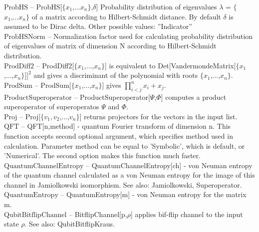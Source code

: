 \documentclass[a4paper,10pt]{scrartcl}
\begin{document}
\textbf{$ \text{ProbHS} $ }-- ProbHS[$\{$$ x_1\text{,...}x_n $$\}$,$\delta $] Probability distribution of eigenvalues $\lambda $ = $\{$$ x_1\text{,...}x_n $$\}$ of a matrix according to Hilbert-Schmidt distance. By default $\delta $ is assumed to be Dirac delta. Other possible values: ''Indicator''$  $\\

\textbf{$ \text{ProbHSNorm} $ }-- Normalization factor used for calculating probability distribution of eigenvalues of matrix of dimension N according to Hilbert-Schmidt distribution.$  $\\

\textbf{$ \text{ProdDiff2} $ }-- ProdDiff2[$\{$$ x_1 $,...,$ x_n $$\}$] is equivalent to Det[VandermondeMatrix[$\{$$ x_1 $,...,$ x_n $$\}$]$ ]^2 $ and gives a discriminant of the polynomial with roots $\{$$ x_1 $,...,$ x_n $$\}$.$  $\\

\textbf{$ \text{ProdSum} $ }-- ProdSum[$\{$$ x_1 $,...,$ x_n $$\}$] gives $ \prod _{i<j}^nx_i+x_j. $\\

\textbf{$ \text{ProductSuperoperator} $ }-- ProductSuperoperator[$\Psi $,$\Phi $] computes a product superoperator of superoperatos $\Psi $ and $\Phi $.$  $\\

\textbf{$ \text{Proj} $ }-- Proj[$\{$$ v_1,v_2 $,...,$ v_n $$\}$] returns projectors for the vectors in the input list.$  $\\

\textbf{$ \text{QFT} $ }-- QFT[n,method] - quantum Fourier transform of dimension n. This function accepts second optional argument, which specifies method used in calculation. Parameter method can be equal to 'Symbolic', which is default, or 'Numerical'. The second option makes this function much faster.$  $\\

\textbf{$ \text{QuantumChannelEntropy} $ }-- QuantumChannelEntropy[ch] - von Neuman entropy of the quantum channel calculated as a von Neuman entropy for the image of this channel in Jamiolkowski isomorphism. See also: Jamiolkowski, Superoperator.$  $\\

\textbf{$ \text{QuantumEntropy} $ }-- QuantumEntropy[m] - von Neuman entropy for the matrix m.$  $\\

\textbf{$ \text{QubitBitflipChannel} $ }-- BitflipChannel[p,$\rho $] applies bif-flip channel to the input state $\rho $. See also: QubitBitflipKraus.$  $\\
\end{document}
